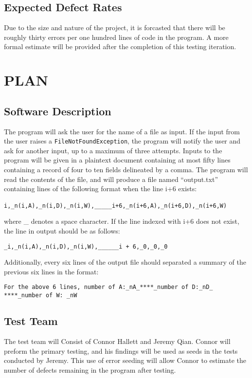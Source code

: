 \documentclass[]{article}
\begin{document}
\subsection{Expected Defect Rates}
\label{sub:references}
Due to the size and nature of the project, it is forcasted that there will be
roughly thirty errors per one hundred lines of code in the program.  A more
formal estimate will be provided after the completion of this testing iteration.


\section{PLAN}
\label{sec:overall_description}

\subsection{Software Description}
\label{sub:product_perspective}
	The program will ask the user for the name of a file as input.  If the input
	from the user raises  a \verb!FileNotFoundException!, the program will notify
	the user and ask for another input, up to a maximum of three attempts. Inputs to the
	program will be given in a plaintext document containing at most fifty lines containing a record of four to ten fields delineated by a comma.
	The program will read the contents of the file, and will produce a file named
	``output.txt'' containing lines of the following format when the line i+6
	exists:
	\begin{center}
	\verb!i,_n(i,A),_n(i,D),_n(i,W),_____i+6,_n(i+6,A),_n(i+6,D),_n(i+6,W)!\
	\end{center}
	where \_ denotes a space character.  If the line indexed with i+6 does not
	exist, the line in output should be as follows:
	\begin{center}
	\verb!_i,_n(i,A),_n(i,D),_n(i,W),______i + 6,_0,_0,_0!
	\end{center}
	Additionally, every six lines of the output file should separated a summary of
	the previous six lines in the format:
	\begin{center}
	\verb!For the above 6 lines, number of A:_nA_****_number of D:_nD_!
	\verb!****_number of W: _nW!
	\end{center}


\subsection{Test Team}
\label{sub:product_functions}
The test team will Consist of Connor Hallett and Jeremy Qian.  Connor
will preform the primary testing, and his findings will be used as seeds in the tests
conducted by Jeremy.  This use of error seeding will allow Connor to estimate
the number of defects remaining in the program after testing.
\end{document}
